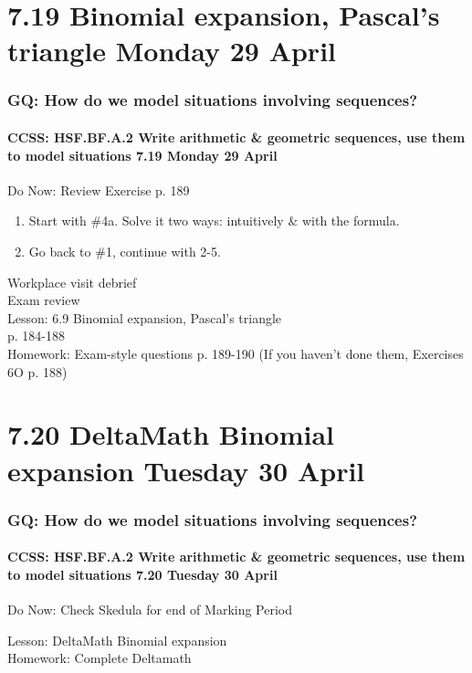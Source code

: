 \documentclass{beamer}
\begin{document}
  \section{7.19 Binomial expansion, Pascal's triangle Monday 29 April}
    \frame
    {
      \frametitle{GQ: How do we model situations involving sequences?}
      \framesubtitle{CCSS: HSF.BF.A.2 Write arithmetic \& geometric sequences, use them to model situations \hfill \alert{7.19 Monday 29 April}}

      \begin{block}{Do Now: Review Exercise p. 189}
        \begin{enumerate}
          \item Start with \#4a. Solve it two ways: intuitively \& with the formula.
          \item Go back to \#1, continue with 2-5.
      \end{enumerate}
      \end{block}
      Workplace visit debrief\\
      Exam review\\
      Lesson: 6.9 Binomial expansion, Pascal's triangle \\p. 184-188\\[1cm]
      Homework: Exam-style questions p. 189-190 (If you haven't done them, Exercises 6O p.  188)
    }

  \section{7.20 DeltaMath Binomial expansion Tuesday 30 April}
    \frame
    {
      \frametitle{GQ: How do we model situations involving sequences?}
      \framesubtitle{CCSS: HSF.BF.A.2 Write arithmetic \& geometric sequences, use them to model situations \hfill \alert{7.20 Tuesday 30 April}}

      \begin{block}{Do Now: Check Skedula for end of Marking Period}
      \end{block}
      Lesson: DeltaMath Binomial expansion\\[1cm]
      Homework: Complete Deltamath
    }
\end{document}
